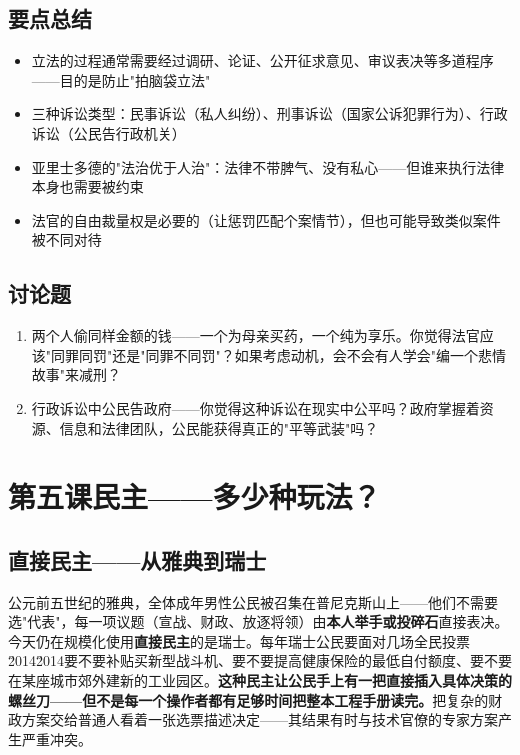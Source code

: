 \documentclass[a4paper,12pt]{ctexart}
\begin{document}
\subsection*{要点总结}
\begin{itemize}
  \item 立法的过程通常需要经过调研、论证、公开征求意见、审议表决等多道程序——目的是防止"拍脑袋立法"
  \item 三种诉讼类型：民事诉讼（私人纠纷）、刑事诉讼（国家公诉犯罪行为）、行政诉讼（公民告行政机关）
  \item 亚里士多德的"法治优于人治"：法律不带脾气、没有私心——但谁来执行法律本身也需要被约束
  \item 法官的自由裁量权是必要的（让惩罚匹配个案情节），但也可能导致类似案件被不同对待
\end{itemize}

\subsection*{讨论题}
\begin{enumerate}
  \item 两个人偷同样金额的钱——一个为母亲买药，一个纯为享乐。你觉得法官应该"同罪同罚"还是"同罪不同罚"？如果考虑动机，会不会有人学会"编一个悲情故事"来减刑？
  \item 行政诉讼中公民告政府——你觉得这种诉讼在现实中公平吗？政府掌握着资源、信息和法律团队，公民能获得真正的"平等武装"吗？
\end{enumerate}

\newpage
\section{\textcolor{orange!80!black}{第五课\quad 民主——多少种玩法？}}

\subsection*{直接民主——从雅典到瑞士}

公元前五世纪的雅典，全体成年男性公民被召集在普尼克斯山上——他们不需要选"代表"，每一项议题（宣战、财政、放逐将领）由\textbf{本人举手或投碎石}直接表决。今天仍在规模化使用\textbf{直接民主}的是瑞士。每年瑞士公民要面对几场全民投票\u2014\u2014要不要补贴买新型战斗机、要不要提高健康保险的最低自付额度、要不要在某座城市郊外建新的工业园区。\textbf{这种民主让公民手上有一把直接插入具体决策的螺丝刀——但不是每一个操作者都有足够时间把整本工程手册读完。}把复杂的财政方案交给普通人看着一张选票描述决定——其结果有时与技术官僚的专家方案产生严重冲突。
\end{document}
